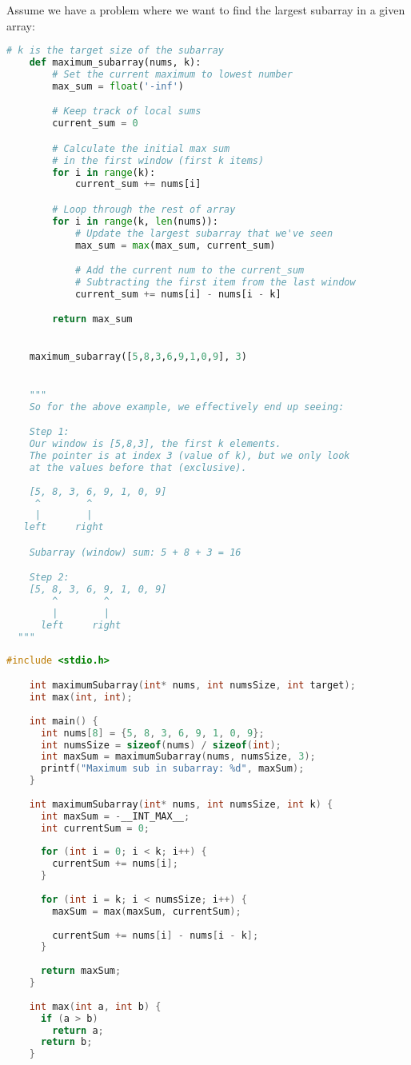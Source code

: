 \documentclass[12pt, letterpaper]{report}
\begin{document}
Assume we have a problem where we want to find the largest subarray in a given array:
\begin{lstlisting}[language=Python,style=python,caption={Sliding Window In Python}]
    # k is the target size of the subarray
    def maximum_subarray(nums, k):
        # Set the current maximum to lowest number
        max_sum = float('-inf')

        # Keep track of local sums
        current_sum = 0

        # Calculate the initial max sum
        # in the first window (first k items)
        for i in range(k):
            current_sum += nums[i]

        # Loop through the rest of array
        for i in range(k, len(nums)):
            # Update the largest subarray that we've seen
            max_sum = max(max_sum, current_sum)

            # Add the current num to the current_sum
            # Subtracting the first item from the last window
            current_sum += nums[i] - nums[i - k]

        return max_sum
        

    maximum_subarray([5,8,3,6,9,1,0,9], 3)


    """
    So for the above example, we effectively end up seeing:

    Step 1:
    Our window is [5,8,3], the first k elements.
    The pointer is at index 3 (value of k), but we only look
    at the values before that (exclusive).
    
    [5, 8, 3, 6, 9, 1, 0, 9]
     ^        ^
     |        |
   left     right

    Subarray (window) sum: 5 + 8 + 3 = 16

    Step 2:
    [5, 8, 3, 6, 9, 1, 0, 9]
        ^        ^
        |        |
      left     right
  """
\end{lstlisting}

\pagebreak
\begin{lstlisting}[language=C,style=c,caption={Sliding Window In C}]
    #include <stdio.h>

    int maximumSubarray(int* nums, int numsSize, int target);
    int max(int, int);
    
    int main() {
      int nums[8] = {5, 8, 3, 6, 9, 1, 0, 9};
      int numsSize = sizeof(nums) / sizeof(int);
      int maxSum = maximumSubarray(nums, numsSize, 3);
      printf("Maximum sub in subarray: %d", maxSum);
    }
    
    int maximumSubarray(int* nums, int numsSize, int k) {
      int maxSum = -__INT_MAX__;
      int currentSum = 0;
    
      for (int i = 0; i < k; i++) {
        currentSum += nums[i];
      }
    
      for (int i = k; i < numsSize; i++) {
        maxSum = max(maxSum, currentSum);
    
        currentSum += nums[i] - nums[i - k];
      }
    
      return maxSum;
    }
    
    int max(int a, int b) {
      if (a > b)
        return a;
      return b;
    }
\end{lstlisting}
\end{document}
